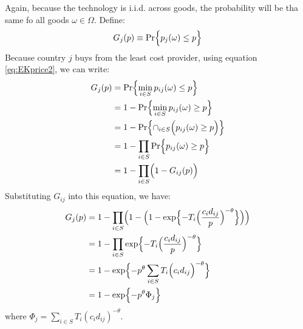 Again, because the technology is i.i.d. across goods, the probability will be tha same fo all goods $\omega \in \Omega$.
Define:
\begin{gather}
    G_j(p) \equiv \operatorname{Pr} \Bigl\{ p_j(\omega) \leq p \Bigr\}
\end{gather}
Because country $j$ buys from the least cost provider, using equation \ref{eq:EKprice2}, we can write:
\begin{align*}
    G_j(p) &= \operatorname{Pr} \Bigl\{ \min_{i \in S} p_{ij}(\omega) \leq p \Bigr\} \\
    &= 1 - \operatorname{Pr} \Bigl\{ \min_{i \in S} p_{ij}(\omega) \geq p \Bigr\} \\
    &= 1 - \operatorname{Pr} \Bigl\{ \cap_{i \in S} \Bigl( p_{ij}(\omega) \geq p \Bigr) \Bigr\} \\
    &= 1 - \prod_{i \in S} \operatorname{Pr} \Bigl\{ p_{ij}(\omega) \geq p \Bigr\} \\
    &= 1 - \prod_{i \in S} \Bigl( 1 - G_{ij}(p) \Bigr)
\end{align*}
Substituting $G_{ij}$ into this equation, we have:
\begin{align*}
    G_j(p) &= 1 - \prod_{i \in S} \Bigl( 1 - \Bigl( 1 - \exp \Bigl\{ -T_i \Bigl( \frac{c_i d_{ij}}{p} \Bigr)^{-\theta} \Bigr\} \Bigr) \Bigr) \\
    &= 1 - \prod_{i \in S} \exp \Bigl\{ -T_i \Bigl( \frac{c_i d_{ij}}{p} \Bigr)^{-\theta} \Bigr\} \\
    &= 1 - \exp \Bigl\{ -p^{\theta} \sum_{i \in S} T_i \Bigl( c_i d_{ij} \Bigr)^{-\theta} \Bigr\} \\
    &= 1 - \exp \Bigl\{-p^{\theta} \Phi_j \Bigr\}
\end{align*}
where $\Phi_j = \sum_{i \in S} T_i (c_i d_{ij})^{-\theta}$.